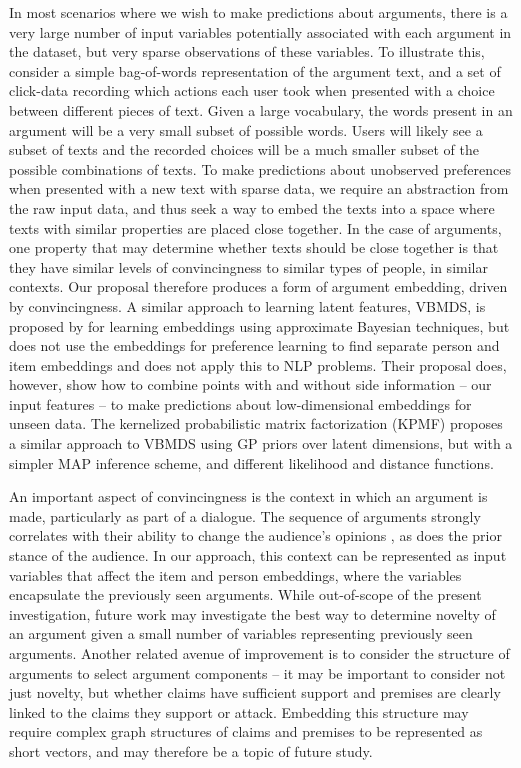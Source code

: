 In most scenarios where we wish to make predictions about arguments, 
there is a very large number of input variables potentially associated with each argument in the dataset,
but very sparse observations of these variables. 
To illustrate this, consider a simple bag-of-words representation of the argument text, and a set
of click-data recording which actions each user took when presented with a choice between different pieces of text. 
Given a large vocabulary, the words present in an argument will be a very small subset of possible words. Users will likely see a subset of texts and the recorded choices will be a much smaller subset of 
the possible combinations of texts. 
To make predictions about unobserved preferences when presented with a new text with sparse data,
we require an abstraction from the raw input data, and thus seek a way to embed the texts into a space 
where texts with similar properties are placed close together. In the case of arguments, one property
that may determine whether texts should be close together is that they have similar levels of 
convincingness to similar types of people, in similar contexts. Our proposal therefore produces
a form of argument embedding, driven by convincingness.
A similar approach to learning latent features, VBMDS, is proposed by \cite{soh2016distance} for learning embeddings using approximate Bayesian techniques, but does not use the embeddings for 
preference learning to find separate person and item embeddings and does not apply this to NLP problems.
Their proposal does, however, show how to combine points with and without side information -- our
input features -- to make predictions about low-dimensional embeddings for unseen data. 
The kernelized probabilistic matrix factorization (KPMF) \cite{zhou2012kernelized} 
proposes a similar approach to VBMDS using GP priors over latent dimensions, but with a simpler
MAP inference scheme, and different likelihood and distance functions. 

An important aspect of convincingness is the context in which an argument is made, particularly
as part of a dialogue. The sequence of arguments strongly correlates with their ability to change
the audience's opinions \cite{tan2016winning}, as does the prior stance of the audience\cite{lukin2017argument}. 
In our approach, this context can be represented as input variables that affect the item and person embeddings, where the variables encapsulate the previously seen arguments.
While out-of-scope of the present investigation, future work may investigate the best way to
determine novelty of an argument given a small number of variables representing previously seen arguments.
Another related avenue of improvement is to consider the structure of arguments to select 
argument components -- it may be important to consider not just novelty, but whether claims have 
sufficient support and premises are clearly linked to the claims they support or attack. 
Embedding this structure may require complex graph structures of claims and premises to be represented
as short vectors, and may therefore be a topic of future study. 

